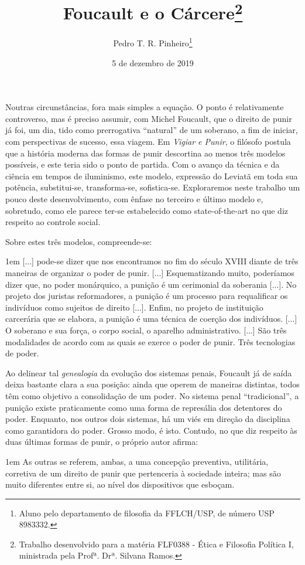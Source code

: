 \documentclass[12pt,a4paper]{article}
\author{Pedro T. R. Pinheiro\footnote{Aluno pelo departamento de filosofia 
da FFLCH/USP, de número USP 8983332. }}
\title{Foucault e o Cárcere\footnote{
	Trabalho desenvolvido para a matéria FLF0388 - Ética e Filosofia 
	Política I, ministrada pela Profª. Drª. Silvana Ramos. }}
\date{5 de dezembro de 2019}
\newenvironment{citac}
{
	\begin{addmargin}
		[4cm]{1em} \footnotesize}{\normalfont 
	\end{addmargin}
}
\begin{document}
	\maketitle
	
	\onehalfspacing
	\setlength{\parskip}{0.5cm}
	
	Noutras circunstâncias, fora mais simples a equação. O ponto é 
	relativamente controverso, mas é preciso assumir, com Michel 
	Foucault, que o direito de punir já foi, um dia, tido como 
	prerrogativa “natural” de um soberano, a fim de iniciar, com 
	perspectivas de sucesso, essa viagem. Em \textit{Vigiar e Punir}, 
	o filósofo postula que a história moderna 
	das formas de punir descortina ao menos três modelos possíveis, 
	e este teria sido o ponto de partida. Com o avanço da técnica e 
	da ciência em tempos de iluminismo, este modelo, expressão do 
	Leviatã em toda sua potência, substitui-se, transforma-se, 
	sofistica-se. Exploraremos neste trabalho um pouco deste desenvolvimento, 
	com ênfase no terceiro e último modelo e, sobretudo, como ele parece 
	ter-se estabelecido como state-of-the-art no que diz respeito ao 
	controle social.
	
	Sobre estes três modelos, compreende-se: 
	
	\begin{citac}
		[...] pode-se dizer que nos encontramos no fim do século XVIII 
		diante de três maneiras de organizar o poder de punir. [...] 
		Esquematizando muito, poderíamos dizer que, no poder 
		monárquico, a punição é um cerimonial da soberania [...]. No 
		projeto dos juristas reformadores, a punição é um processo 
		para requalificar os indivíduos como sujeitos de direito 
		[...]. Enfim, no projeto de instituição carcerária que se 
		elabora, a punição é uma técnica de coerção dos indivíduos. 
		[...] O soberano e sua força, o corpo social, o aparelho 
		administrativo. [...] São três modalidades de acordo com 
		as quais se exerce o poder de punir. Três tecnologias de poder. 
		\cite{foucault}
	\end{citac}

	Ao delinear tal \emph{genealogia} da evolução dos sistemas penais, 
	Foucault já de saída deixa bastante clara a sua posição: ainda que 
	operem de maneiras distintas, todos têm como objetivo a consolidação 
	de um poder. No sistema penal ``tradicional'', a punição existe 
	praticamente como uma forma de represália dos detentores do poder. 
	Enquanto, nos outros dois sistemas, há um viés em direção da 
	disciplina como garantidora do poder. Grosso modo, é isto. Contudo, 
	no que diz respeito às duas últimas formas de punir, o 
	próprio autor afirma: 
	\begin{citac}
		As outras se referem, ambas, a uma concepção preventiva, 
		utilitária, corretiva de um direito de punir que pertenceria 
		à sociedade inteira; mas são muito diferentes entre si, ao 
		nível dos dispositivos que esboçam. \cite{foucault}
	\end{citac}
\end{document}
